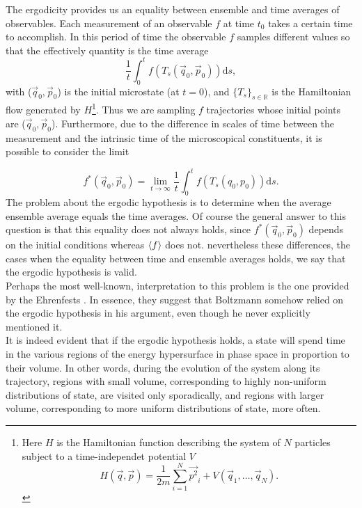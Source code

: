 \indent The ergodicity provides us an equality between ensemble and time averages of observables. Each measurement of an observable $f$ at time $t_0$ takes a certain time to accomplish. In this period of time the observable $f$ samples different values so that the effectively quantity is the time average
\begin{equation}
\frac{1}{t} \int_{0}^{t} f\left(T_{s}\left(\vec{q}_{0}, \vec{p}_{0}\right)\right) \mathrm{d} s,
\end{equation}
with ($\vec{q}_{0}, \vec{p}_{0}$) is the initial microstate (at $t=0$), and $\{T_s\}_{s\in \mathbb{R}}$ is the Hamiltonian flow generated by $H$\footnote{Here $H$ is the Hamiltonian function describing the system of $N$ particles subject to a time-independet potential $V$
\[H(\vec{q}, \vec{p})=\frac{1}{2 m} \sum_{i=1}^{N} \vec{p^{2}}_{i}+V\left(\vec{q}_{1}, \ldots, \vec{q}_{N}\right).\] }. Thus we are sampling $f$  trajectories whose initial points are ($\vec{q}_0, \vec{p}_0$). Furthermore, due to the difference in scales of time between the measurement and the intrinsic time of the microscopical constituents, it is possible to consider the limit

\begin{equation}
f^{*}\left(\vec{q}_{0},\vec{p}_{0}\right)=\lim _{t \rightarrow \infty} \frac{1}{t} \int_{0}^{t} f\left(T_{s}\left(q_{0}, p_{0}\right)\right) \mathrm{d} s.
\label{CH1:Ergodicity_1}
\end{equation}
The problem about the ergodic hypothesis is to determine when the average ensemble average equals the time averages. Of course the general answer to this question is that this equality does not always holds, since $f^{*}(\vec{q}_{0},\vec{p}_{0})$ depends on the initial conditions whereas $\mathinner{\langle{f}\rangle}$ does not. nevertheless these differences, the cases when the equality between time and ensemble averages holds, we say that the ergodic hypothesis is valid.\\

\indent Perhaps the most well-known, interpretation to this problem is the one provided by the Ehrenfests \cite{ehrenfest_conceptual_1959}. In essence, they suggest that Boltzmann somehow relied on the ergodic hypothesis in his argument, even though he never explicitly mentioned it.\\

\indent It is indeed evident that if the ergodic hypothesis holds, a state will spend time in the various regions of the energy hypersurface in phase space in proportion to their volume. In other words, during the evolution of the system along its trajectory, regions with small volume, corresponding to highly non-uniform distributions of state, are visited only sporadically, and regions with larger volume, corresponding to more uniform distributions of state, more often.\\

